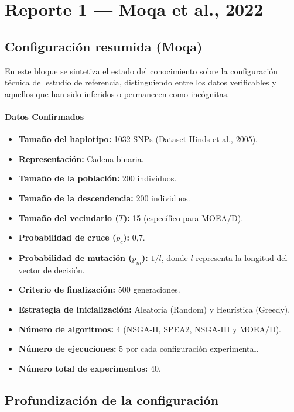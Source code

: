 \documentclass[a4paper,10pt]{article}
\begin{document}
\newpage
\tableofcontents

\section{Reporte 1 — Moqa et al., 2022}
\subsection{Configuración resumida (Moqa)}
En este bloque se sintetiza el estado del conocimiento sobre la configuración técnica del estudio de referencia, distinguiendo entre los datos verificables y aquellos que han sido inferidos o permanecen como incógnitas.


 \paragraph{Datos Confirmados}
 \begin{itemize}
     \item \textbf{Tamaño del haplotipo:} 1032 SNPs (Dataset Hinds et al., 2005).
     \item \textbf{Representación:} Cadena binaria.
     \item \textbf{Tamaño de la población:} 200 individuos.
     \item \textbf{Tamaño de la descendencia:} 200 individuos.
     \item \textbf{Tamaño del vecindario ($T$):} 15 (específico para MOEA/D).
     \item \textbf{Probabilidad de cruce ($p_c$):} 0,7.
     \item \textbf{Probabilidad de mutación ($p_m$):} $1/l$, donde $l$ representa la longitud del vector de decisión.
     \item \textbf{Criterio de finalización:} 500 generaciones.
     \item \textbf{Estrategia de inicialización:} Aleatoria (Random) y Heurística (Greedy).
     \item \textbf{Número de algoritmos:} 4 (NSGA-II, SPEA2, NSGA-III y MOEA/D).
     \item \textbf{Número de ejecuciones:} 5 por cada configuración experimental.
     \item \textbf{Número total de experimentos:} 40.
 \end{itemize}


\subsection{Profundización de la configuración}
\label{sec:marco_repro_moqa}
\end{document}
